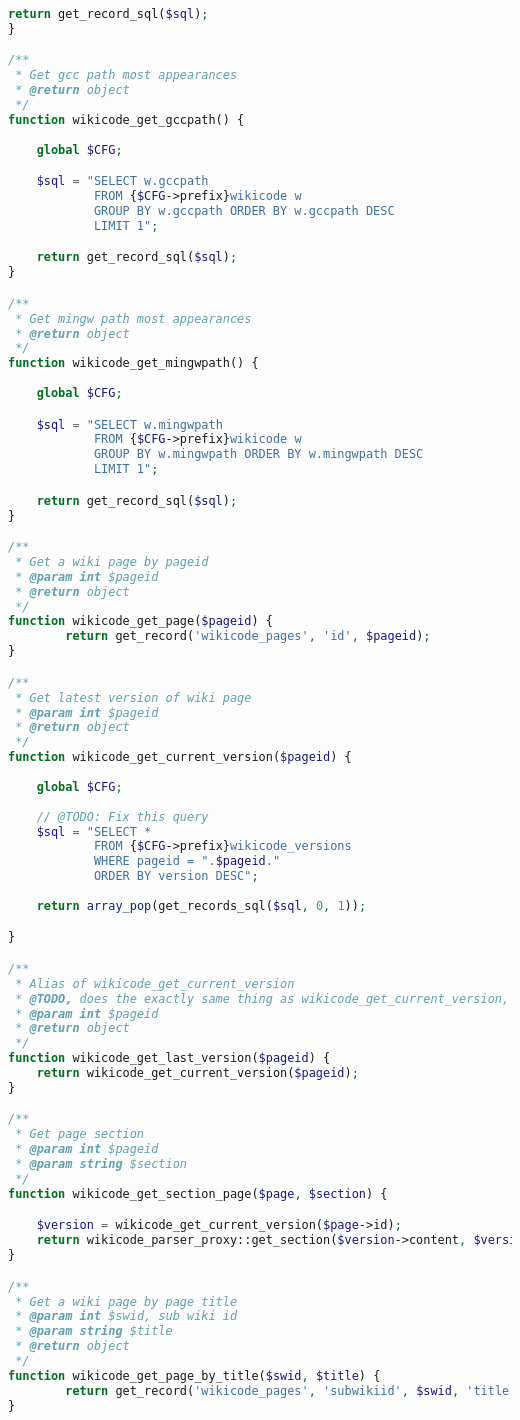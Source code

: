 \begin{lstlisting}[language=PHP]
    return get_record_sql($sql);
}

/**
 * Get gcc path most appearances
 * @return object
 */
function wikicode_get_gccpath() {
	
	global $CFG;

    $sql = "SELECT w.gccpath
            FROM {$CFG->prefix}wikicode w
            GROUP BY w.gccpath ORDER BY w.gccpath DESC
            LIMIT 1";

    return get_record_sql($sql);
}

/**
 * Get mingw path most appearances
 * @return object
 */
function wikicode_get_mingwpath() {
	
	global $CFG;

    $sql = "SELECT w.mingwpath
            FROM {$CFG->prefix}wikicode w
            GROUP BY w.mingwpath ORDER BY w.mingwpath DESC
            LIMIT 1";

    return get_record_sql($sql);
}

/**
 * Get a wiki page by pageid
 * @param int $pageid
 * @return object
 */
function wikicode_get_page($pageid) {
        return get_record('wikicode_pages', 'id', $pageid);
}

/**
 * Get latest version of wiki page
 * @param int $pageid
 * @return object
 */
function wikicode_get_current_version($pageid) {
		
	global $CFG;
    
    // @TODO: Fix this query
    $sql = "SELECT *
            FROM {$CFG->prefix}wikicode_versions
            WHERE pageid = ".$pageid."
            ORDER BY version DESC";
			
    return array_pop(get_records_sql($sql, 0, 1));

}

/**
 * Alias of wikicode_get_current_version
 * @TODO, does the exactly same thing as wikicode_get_current_version, should be removed
 * @param int $pageid
 * @return object
 */
function wikicode_get_last_version($pageid) {
    return wikicode_get_current_version($pageid);
}

/**
 * Get page section
 * @param int $pageid
 * @param string $section
 */
function wikicode_get_section_page($page, $section) {

    $version = wikicode_get_current_version($page->id);
    return wikicode_parser_proxy::get_section($version->content, $version->contentformat, $section);
}

/**
 * Get a wiki page by page title
 * @param int $swid, sub wiki id
 * @param string $title
 * @return object
 */
function wikicode_get_page_by_title($swid, $title) {
        return get_record('wikicode_pages', 'subwikiid', $swid, 'title', $title);
}


\end{lstlisting}
